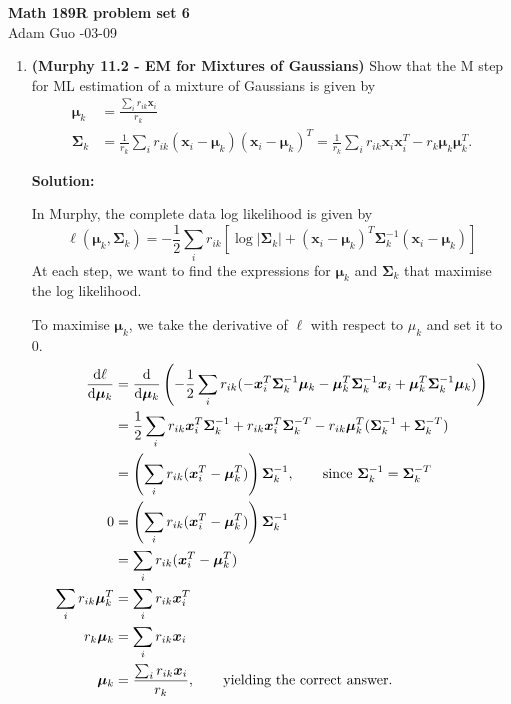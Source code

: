 \documentclass[letter,11pt]{article}
\newenvironment{solution}{
    \vspace{0.16in} {\bf Solution:}
    
}{
	\vspace{0.16in}
}
\newcommand{\xx}{\bm{x}}
\newcommand{\T}{T}
\newcommand{\mub}{\bm{\mu}}
\newcommand{\Sigmab}{\bm{\Sigma}}
\begin{document}
\begin{center}
    {\bf \Large Math 189R problem set 6} \\
    \vspace{0.1in}
    Adam Guo -03-09
\end{center}

\begin{enumerate}
    \item \textbf{(Murphy 11.2 - EM for Mixtures of Gaussians)} Show that the M step for ML estimation of a mixture of Gaussians is given by
    \begin{align*}
        \mub_k &= \frac{\sum_i r_{ik}\xx_i}{r_k} \\
        \Sigmab_k &= \frac{1}{r_k}\sum_i r_{ik}(\xx_i - \mub_k)(\xx_i - \mub_k)^\T = \frac{1}{r_k}\sum_i r_{ik}\xx_i\xx_i^\T - r_k\mub_k\mub_k^\T.
    \end{align*}

    \begin{solution}
        In Murphy, the complete data log likelihood is given by \[\ell(\mub_k, \Sigmab_k) = -\frac{1}{2}\sum_i r_{ik} [\log |\Sigmab_k| + (\xx_i - \mub_k)^T \Sigmab_k^{-1} (\xx_i - \mub_k)]\] At each step, we want to find the expressions for $\mub_k$ and $\Sigmab_k$ that maximise the log likelihood.

        To maximise $\mub_k$, we take the derivative of $\ell$ with respect to $\mu_k$ and set it to 0.
        \begin{align*}
            \dv{\ell}{\mub_k} &= \dv{\mub_k} \left(-\frac{1}{2} \sum_i r_{ik} (-\xx_i^T\Sigmab_k^{-1}\mub_k - \mub_k^T\Sigmab_k^{-1}\xx_i + \mub_k^T\Sigmab_k^{-1}\mub_k)\right) \\
                              &= \frac{1}{2} \sum_i r_{ik}\xx_i^T\Sigmab_k^{-1} + r_{ik}\xx_i^T\Sigmab_k^{-T} - r_{ik}\mub_k^T(\Sigmab_k^{-1} + \Sigmab_k^{-T}) \\
                              &= \left(\sum_i r_{ik}(\xx_i^T - \mub_k^T)\right)\Sigmab_k^{-1}, \quad\quad \text{since $\Sigmab_k^{-1} = \Sigmab_k^{-T}$} \\
            0 &= \left(\sum_i r_{ik}(\xx_i^T - \mub_k^T)\right)\Sigmab_k^{-1} \\
              &= \sum_i r_{ik}(\xx_i^T - \mub_k^T) \\
            \sum_i r_{ik} \mub_k^T &= \sum_i r_{ik} \xx_i^T \\
            r_k \mub_k &= \sum_i r_{ik} \xx_i \\
            \mub_k &= \frac{\sum_i r_{ik} \xx_i}{r_k}, \quad\quad \text{yielding the correct answer.}
        \end{align*}


\end{solution}
\end{enumerate}
\end{document}
